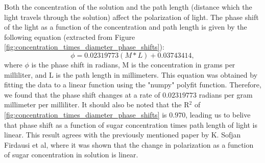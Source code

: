 

Both the concentration of the solution and the path length (distance which the light travels through the solution) affect the polarization of light. The phase shift of the light as a function of the concentration and path length is given by the following equation (extracted from Figure \ref{fig:concentration_times_diameter_phase_shifts}):
\begin{equation}
\phi = 0.02319773(M*L) + 0.03743414,
\end{equation}
where $\phi$ is the phase shift in radians, M is the concentration in grams per milliliter, and L is the path length in millimeters. This equation was obtained by fitting the data to a linear function using the "numpy" polyfit function. Therefore, we found that the phase shift changes at a rate of $0.02319773$ radians per gram millimeter per milliliter. It should also be noted that the R$^2$ of \ref{fig:concentration_times_diameter_phase_shifts} is $0.970$, leading us to belive that phase shift as a function of sugar concentration times path length of light is linear. This result agrees with the previously mentioned paper by K. Sofjan Firdausi et al, where it was shown that the change in polarization as a function of sugar concentration in solution is linear\cite{Firsdausi2018}.

